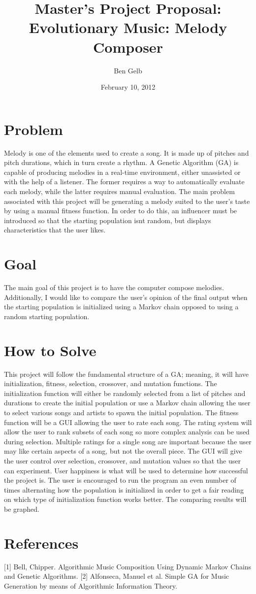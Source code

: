 \documentclass[english]{article}
\begin{document}
\title{Master's Project Proposal: \\ Evolutionary Music: Melody Composer}



\author{Ben Gelb}


\date{February 10, 2012}

\maketitle

\section{Problem}
Melody is one of the elements used to create a song. It is made up of pitches and pitch durations, which in turn create a rhythm. A Genetic Algorithm (GA) is capable of producing melodies in a real-time environment, either unassisted or with the help of a listener. The former requires a way to automatically evaluate each melody, while the latter requires manual evaluation. The main problem associated with this project will be generating a melody suited to the user's taste by using a manual fitness function. In order to do this, an influencer must be introduced so that the starting population isnt random, but displays characteristics that the user likes. 
\section{Goal}
The main goal of this project is to have the computer compose melodies. Additionally, I would like to compare the user's opinion of the final output when the starting population is initialized using a Markov chain opposed to using a random starting population.
\section{How to Solve}
This project will follow the fundamental structure of a GA; meaning, it will have initialization, fitness, selection, crossover, and mutation functions. The initialization function will either be randomly selected from a list of pitches and durations to create the initial population or use a Markov chain allowing the user to select various songs and artists to spawn the initial population. The fitness function will be a GUI allowing the user to rate each song. The rating system will allow the user to rank subsets of each song so more complex analysis can be used during selection. Multiple ratings for a single song are important because the user may like certain aspects of a song, but not the overall piece. The GUI will give the user control over selection, crossover, and mutation values so that the user can experiment. User happiness is what will be used to determine how successful the project is. The user is encouraged to run the program an even number of times alternating how the population is initialized in order to get a fair reading on which type of initialization function works better. The comparing results will be graphed. 

\section{References}
[1] Bell, Chipper. Algorithmic Music Composition Using Dynamic Markov Chains and Genetic Algorithms.
[2] Alfonseca, Manuel et al. Simple GA for Music Generation by means of Algorithmic Information Theory.
\end{document}
